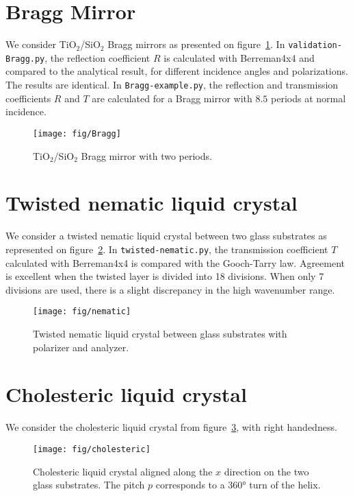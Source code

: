\section{Bragg Mirror}
We consider TiO$_2$/SiO$_2$ Bragg mirrors as presented on figure~\ref{fig:Bragg}.
In \verb/validation-Bragg.py/, the reflection coefficient $R$ is calculated with Berreman4x4 and compared to the analytical result\cite{Wikipedia_Fresnel}, for different incidence angles and polarizations. 
The results are identical.
In \verb/Bragg-example.py/, the reflection and transmission coefficients $R$ and $T$ are calculated for a Bragg mirror with $8.5$ periods at normal incidence.
\begin{figure}[!h]
\texttt{[image: fig/Bragg]}
\caption{\label{fig:Bragg}TiO$_2$/SiO$_2$ Bragg mirror with two periods.}
\end{figure}

\section{Twisted nematic liquid crystal}
We consider a twisted nematic liquid crystal between two glass substrates as represented on figure~\ref{fig:nematic}.  
In \verb/twisted-nematic.py/, the transmission coefficient $T$ calculated with Berreman4x4 is compared with the Gooch-Tarry law.
Agreement is excellent when the twisted layer is divided into 18 divisions.
When only 7 divisions are used, there is a slight discrepancy in the high wavenumber range.

\begin{figure}[!h]
\begin{center}
\texttt{[image: fig/nematic]}
\caption{\label{fig:nematic} Twisted nematic liquid crystal between glass substrates with polarizer and analyzer.}
\end{center}
\end{figure}

\section{Cholesteric liquid crystal}
We consider the cholesteric liquid crystal from figure~\ref{fig:cholesteric}, with right handedness.

\begin{figure}[!h]
\begin{center}
\texttt{[image: fig/cholesteric]}
\end{center}
\caption{\label{fig:cholesteric}Cholesteric liquid crystal aligned along the $x$ direction on the two glass substrates. The pitch $p$ corresponds to a 360° turn of the helix.}
\end{figure}


